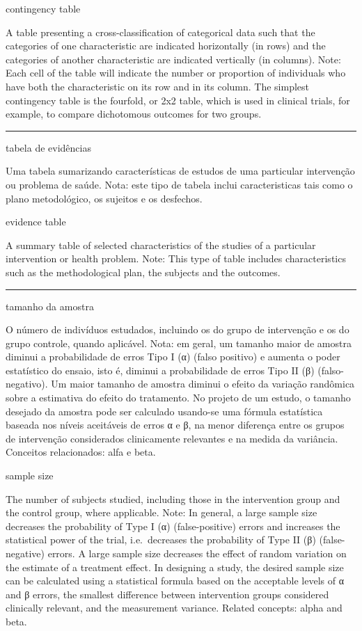 \documentclass[
]{book}
\begin{document}
contingency table

A table presenting a cross-classification of categorical data such that the categories of one characteristic are indicated horizontally (in rows) and the categories of another characteristic are indicated vertically (in columns). Note: Each cell of the table will indicate the number or proportion of individuals who have both the characteristic on its row and in its column. The simplest contingency table is the fourfold, or 2x2 table, which is used in clinical trials, for example, to compare dichotomous outcomes for two groups.

\begin{center}\rule{0.5\linewidth}{0.5pt}\end{center}

tabela de evidências

Uma tabela sumarizando características de estudos de uma particular intervenção ou problema de saúde. Nota: este tipo de tabela inclui caracteristicas tais como o plano metodológico, os sujeitos e os desfechos.

evidence table

A summary table of selected characteristics of the studies of a particular intervention or health problem. Note: This type of table includes characteristics such as the methodological plan, the subjects and the outcomes.

\begin{center}\rule{0.5\linewidth}{0.5pt}\end{center}

tamanho da amostra

O número de indivíduos estudados, incluindo os do grupo de intervenção e os do grupo controle, quando aplicável. Nota: em geral, um tamanho maior de amostra diminui a probabilidade de erros Tipo I (α) (falso positivo) e aumenta o poder estatístico do ensaio, isto é, diminui a probabilidade de erros Tipo II (β) (falso-negativo). Um maior tamanho de amostra diminui o efeito da variação randômica sobre a estimativa do efeito do tratamento. No projeto de um estudo, o tamanho desejado da amostra pode ser calculado usando-se uma fórmula estatística baseada nos níveis aceitáveis de erros α e β, na menor diferença entre os grupos de intervenção considerados clinicamente relevantes e na medida da variância. Conceitos relacionados: alfa e beta.

sample size

The number of subjects studied, including those in the intervention group and the control group, where applicable. Note: In general, a large sample size decreases the probability of Type I (α) (false-positive) errors and increases the statistical power of the trial, i.e.~decreases the probability of Type II (β) (false-negative) errors. A large sample size decreases the effect of random variation on the estimate of a treatment effect. In designing a study, the desired sample size can be calculated using a statistical formula based on the acceptable levels of α and β errors, the smallest difference between intervention groups considered clinically relevant, and the measurement variance. Related concepts: alpha and beta.
\end{document}
